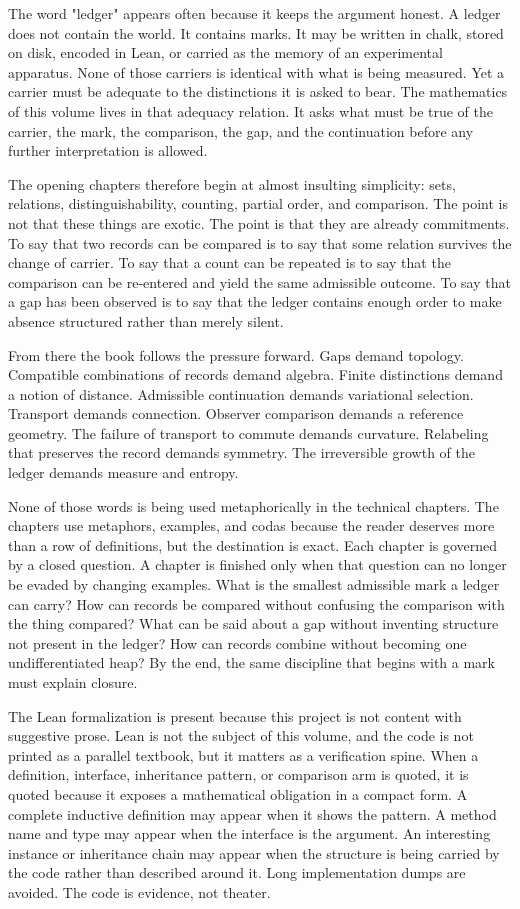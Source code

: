 The word "ledger" appears often because it keeps the argument honest. A ledger
does not contain the world. It contains marks. It may be written in chalk,
stored on disk, encoded in Lean, or carried as the memory of an experimental
apparatus. None of those carriers is identical with what is being measured.
Yet a carrier must be adequate to the distinctions it is asked to bear. The
mathematics of this volume lives in that adequacy relation. It asks what must be
true of the carrier, the mark, the comparison, the gap, and the continuation
before any further interpretation is allowed.

The opening chapters therefore begin at almost insulting simplicity: sets,
relations, distinguishability, counting, partial order, and comparison. The
point is not that these things are exotic. The point is that they are already
commitments. To say that two records can be compared is to say that some
relation survives the change of carrier. To say that a count can be repeated is
to say that the comparison can be re-entered and yield the same admissible
outcome. To say that a gap has been observed is to say that the ledger contains
enough order to make absence structured rather than merely silent.

From there the book follows the pressure forward. Gaps demand topology.
Compatible combinations of records demand algebra. Finite distinctions demand a
notion of distance. Admissible continuation demands variational selection.
Transport demands connection. Observer comparison demands a reference geometry.
The failure of transport to commute demands curvature. Relabeling that preserves
the record demands symmetry. The irreversible growth of the ledger demands
measure and entropy.

None of those words is being used metaphorically in the technical chapters. The
chapters use metaphors, examples, and codas because the reader deserves more
than a row of definitions, but the destination is exact. Each chapter is governed
by a closed question. A chapter is finished only when that question can no
longer be evaded by changing examples. What is the smallest admissible mark a
ledger can carry? How can records be compared without confusing the comparison
with the thing compared? What can be said about a gap without inventing
structure not present in the ledger? How can records combine without becoming
one undifferentiated heap? By the end, the same discipline that begins with a
mark must explain closure.

The Lean formalization is present because this project is not content with
suggestive prose. Lean is not the subject of this volume, and the code is not
printed as a parallel textbook, but it matters as a verification spine. When a
definition, interface, inheritance pattern, or comparison arm is quoted, it is
quoted because it exposes a mathematical obligation in a compact form. A
complete inductive definition may appear when it shows the pattern. A method
name and type may appear when the interface is the argument. An interesting
instance or inheritance chain may appear when the structure is being carried by
the code rather than described around it. Long implementation dumps are avoided.
The code is evidence, not theater.

